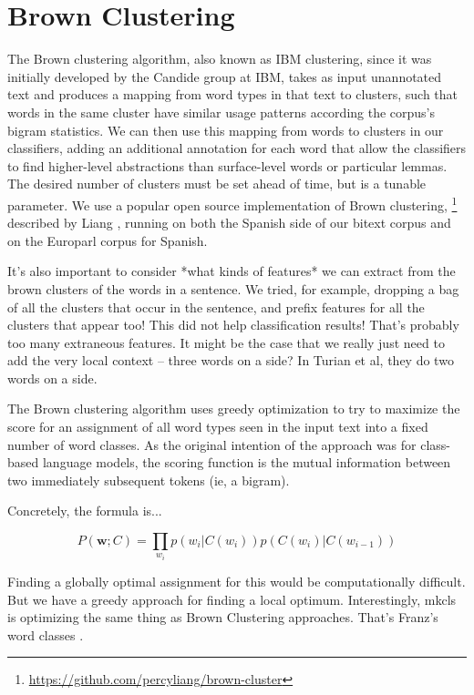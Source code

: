 \section{Brown Clustering}
The Brown clustering algorithm, also known as IBM clustering, since it was
initially developed by the Candide group at IBM, takes as input unannotated
text and produces a mapping from word types in that text to clusters, such that
words in the same cluster have similar usage patterns according the corpus's
bigram statistics.
We can then use this mapping from words to clusters in our classifiers, adding
an additional annotation for each word that allow the classifiers to find
higher-level abstractions than surface-level words or particular lemmas.
The desired number of clusters must be set ahead of time, but is a tunable
parameter.
We use a popular open source implementation of Brown clustering,
\footnote{\url{https://github.com/percyliang/brown-cluster}} described by
Liang \cite{Liang05semi-supervisedlearning}, running on both the Spanish
side of our bitext corpus and on the Europarl corpus \cite{europarl} for
Spanish.

It's also important to consider *what kinds of features* we can extract from
the brown clusters of the words in a sentence. We tried, for example, dropping
a bag of all the clusters that occur in the sentence, and prefix features for
all the clusters that appear too! This did not help classification results!
That's probably too many extraneous features.
It might be the case that we really just need to add the very local context --
three words on a side? In Turian et al, they do two words on a side.



The Brown clustering algorithm uses greedy optimization to try to maximize the
score for an assignment of all word types seen in the input text into a fixed
number of word classes. As the original intention of the approach was for
class-based language models, the scoring function is the mutual information
between two immediately subsequent tokens (ie, a bigram).

Concretely, the formula is...

\begin{equation} \label{eq:brownclassprob}
P(\boldsymbol{w}; C) = \prod_{w_i} p(w_i | C(w_i)) p(C(w_i) | C(w_{i-1}))
\end{equation}

Finding a globally optimal assignment for this would be computationally
difficult. But we have a greedy approach for finding a local optimum.
Interestingly, mkcls is optimizing the same thing as Brown Clustering
approaches. That's Franz's word classes \cite{och1999efficient}.

